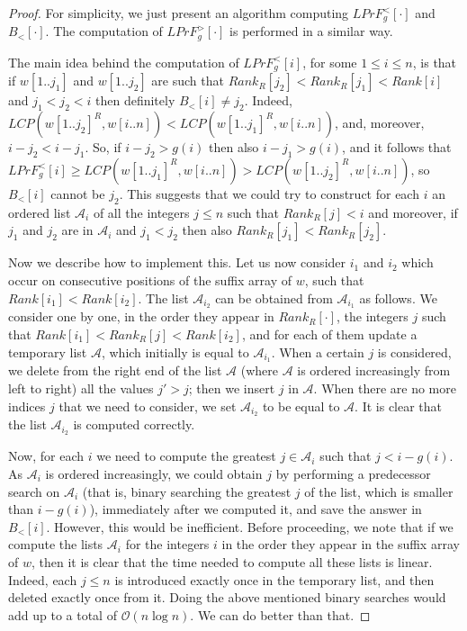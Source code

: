 \documentclass[final]{dmtcs-episciences}
\newcommand{\bigo}{{\mathcal O}}
\newcommand{\LCP}{{\mathit{LCP}}}
\newcommand{\LPF}{{\mathit{LPrF}}}
\begin{document}
\begin{proof}
For simplicity, we just present an algorithm computing $\LPF^{<}_g[\cdot]$ and $B_<[\cdot]$. The computation of $\LPF^{>}_g[\cdot]$ is performed in a similar way.

The main idea behind the computation of $\LPF^{<}_g[i]$, for some $1\leq i\leq n$, is that if $w[1..j_1]$ and $w[1..j_2]$ are such that $Rank_R[j_2]<Rank_R[j_1]<Rank[i]$ and $j_1<j_2<i$ then definitely $B_<[i]\neq j_2$. Indeed, $\LCP(w[1..j_2]^R,w[i..n])<\LCP(w[1..j_1]^R,w[i..n])$, and, moreover, $i-j_2<i-j_1$. So, if $i-j_2>g(i)$ then also $i-j_1>g(i)$, and it follows that $\LPF^{<}_g[i]\geq \LCP(w[1..j_1]^R,w[i..n])> \LCP(w[1..j_2]^R,w[i..n])$, so $B_<[i]$ cannot be $j_2$. This suggests that we could try to construct for each $i$ an ordered list ${\mathcal A}_i$ of all the integers $j\leq n$ such that $Rank_R[j]<i$ and moreover, if $j_1$ and $j_2$ are in ${\mathcal A}_i$ and $j_1<j_2$ then also $Rank_R[j_1]<Rank_R[j_2]$. 

Now we describe how to implement this. Let us now consider $i_1$ and $i_2$ which occur on consecutive positions of the suffix array of $w$, such that $Rank[i_1]<Rank[i_2]$. The list ${\mathcal A}_{i_2}$ can be obtained from ${\mathcal A}_{i_1}$ as follows. We consider one by one, in the order they appear in $Rank_R[\cdot]$, the integers $j$ such that $Rank[i_1]<Rank_R[j]<Rank[i_2]$, and for each of them update a temporary list ${\mathcal A}$, which initially is equal to ${\mathcal A}_{i_1}$. When a certain $j$ is considered, we delete from the right end of the list ${\mathcal A}$ (where ${\mathcal A}$ is ordered increasingly from left to right) all the values $j'>j$; then we insert $j$ in ${\mathcal A}$. When there are no more indices $j$ that we need to consider, we set ${\mathcal A}_{i_2}$ to be equal to ${\mathcal A}$. It is clear that the list ${\mathcal A}_{i_2}$ is computed correctly. 

Now, for each $i$ we need to compute the greatest $j\in {\mathcal A}_i$ such that $j<i-g(i)$. As ${\mathcal A}_i$ is ordered increasingly, we could obtain $j$ by performing a predecessor search on ${\mathcal A}_i$ (that is, binary searching the greatest $j$ of the list, which is smaller than $i-g(i)$), immediately after we computed it, and save the answer in $B_<[i]$. However, this would be inefficient. Before proceeding, we note that if we compute the lists ${\mathcal A}_i$ for the integers $i$ in the order they appear in the suffix array of $w$, then it is clear that the time needed to compute all these lists is linear. Indeed, each $j\leq n$ is introduced exactly once in the temporary list, and then deleted exactly once from it. Doing the above mentioned binary searches would add up to a total of $\bigo(n \log n)$. We can do better than that.


\end{proof}
\end{document}
